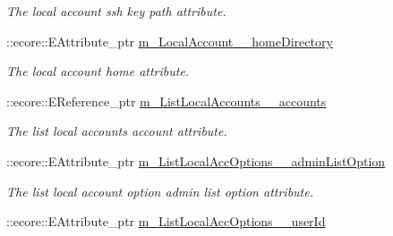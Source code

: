 \begin{DoxyCompactItemize}
\begin{DoxyCompactList}\small\item\em The local account ssh key path attribute. \item\end{DoxyCompactList}\item 
\hypertarget{classUMS__Data_1_1UMS__DataPackage_ad5a88b2c8f942eecea9eecaec6a225a2}{
::ecore::EAttribute\_\-ptr \hyperlink{classUMS__Data_1_1UMS__DataPackage_ad5a88b2c8f942eecea9eecaec6a225a2}{m\_\-LocalAccount\_\-\_\-homeDirectory}}
\label{classUMS__Data_1_1UMS__DataPackage_ad5a88b2c8f942eecea9eecaec6a225a2}

\begin{DoxyCompactList}\small\item\em The local account home attribute. \item\end{DoxyCompactList}\item 
\hypertarget{classUMS__Data_1_1UMS__DataPackage_a14dfe8ea061c837965158c8c5ee1ce64}{
::ecore::EReference\_\-ptr \hyperlink{classUMS__Data_1_1UMS__DataPackage_a14dfe8ea061c837965158c8c5ee1ce64}{m\_\-ListLocalAccounts\_\-\_\-accounts}}
\label{classUMS__Data_1_1UMS__DataPackage_a14dfe8ea061c837965158c8c5ee1ce64}

\begin{DoxyCompactList}\small\item\em The list local accounts account attribute. \item\end{DoxyCompactList}\item 
\hypertarget{classUMS__Data_1_1UMS__DataPackage_a7d760901283b6c97bc7f994e4975e1de}{
::ecore::EAttribute\_\-ptr \hyperlink{classUMS__Data_1_1UMS__DataPackage_a7d760901283b6c97bc7f994e4975e1de}{m\_\-ListLocalAccOptions\_\-\_\-adminListOption}}
\label{classUMS__Data_1_1UMS__DataPackage_a7d760901283b6c97bc7f994e4975e1de}

\begin{DoxyCompactList}\small\item\em The list local account option admin list option attribute. \item\end{DoxyCompactList}\item 
\hypertarget{classUMS__Data_1_1UMS__DataPackage_a6ec01f8f97de420e99d6d2da73c5718d}{
::ecore::EAttribute\_\-ptr \hyperlink{classUMS__Data_1_1UMS__DataPackage_a6ec01f8f97de420e99d6d2da73c5718d}{m\_\-ListLocalAccOptions\_\-\_\-userId}}
\label{classUMS__Data_1_1UMS__DataPackage_a6ec01f8f97de420e99d6d2da73c5718d}


\end{DoxyCompactItemize}

